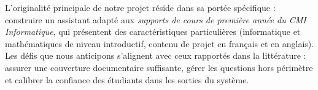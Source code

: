 \documentclass[a4paper,11pt]{article}
\begin{document}
L'originalité principale de notre projet réside dans sa portée spécifique :
construire un assistant adapté aux \emph{supports de cours de première année
du CMI Informatique}, qui présentent des caractéristiques particulières
(informatique et mathématiques de niveau introductif, contenu de projet en
français et en anglais). Les défis que nous anticipons s'alignent avec ceux
rapportés dans la littérature : assurer une couverture documentaire suffisante,
gérer les questions hors périmètre et calibrer la confiance des étudiants
dans les sorties du système.
\newpage



\end{document}
